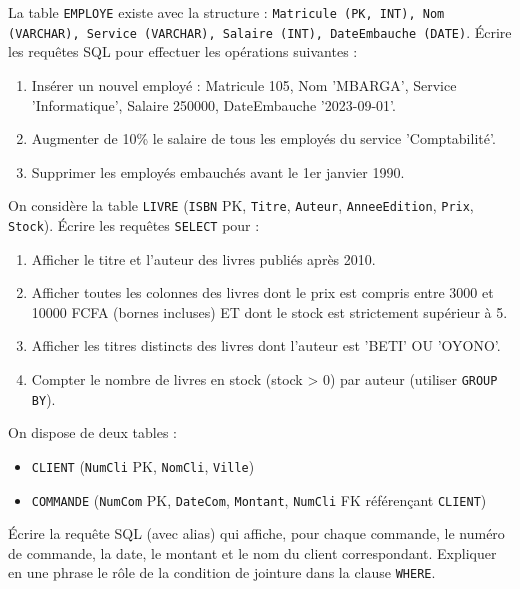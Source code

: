\documentclass[11pt]{article}
\begin{document}
\begin{exercice}
La table \texttt{EMPLOYE} existe avec la structure : \texttt{Matricule (PK, INT), Nom (VARCHAR), Service (VARCHAR), Salaire (INT), DateEmbauche (DATE)}.
Écrire les requêtes SQL pour effectuer les opérations suivantes :
\begin{enumerate}
    \item Insérer un nouvel employé : Matricule 105, Nom 'MBARGA', Service 'Informatique', Salaire 250000, DateEmbauche '2023-09-01'.
    \item Augmenter de 10\% le salaire de tous les employés du service 'Comptabilité'.
    \item Supprimer les employés embauchés avant le 1er janvier 1990.
\end{enumerate}
\end{exercice}

\begin{exercice}
On considère la table \texttt{LIVRE} (\texttt{ISBN} PK, \texttt{Titre}, \texttt{Auteur}, \texttt{AnneeEdition}, \texttt{Prix}, \texttt{Stock}).
Écrire les requêtes \texttt{SELECT} pour :
\begin{enumerate}
    \item Afficher le titre et l'auteur des livres publiés après 2010.
    \item Afficher toutes les colonnes des livres dont le prix est compris entre 3000 et 10000 FCFA (bornes incluses) ET dont le stock est strictement supérieur à 5.
    \item Afficher les titres distincts des livres dont l'auteur est 'BETI' OU 'OYONO'.
    \item Compter le nombre de livres en stock (stock > 0) par auteur (utiliser \texttt{GROUP BY}).
\end{enumerate}
\end{exercice}

\begin{exercice}
On dispose de deux tables :
\begin{itemize}
    \item \texttt{CLIENT} (\texttt{NumCli} PK, \texttt{NomCli}, \texttt{Ville})
    \item \texttt{COMMANDE} (\texttt{NumCom} PK, \texttt{DateCom}, \texttt{Montant}, \texttt{NumCli} FK référençant \texttt{CLIENT})
\end{itemize}
Écrire la requête SQL (avec alias) qui affiche, pour chaque commande, le numéro de commande, la date, le montant et le nom du client correspondant. Expliquer en une phrase le rôle de la condition de jointure dans la clause \texttt{WHERE}.
\end{exercice}
\end{document}
